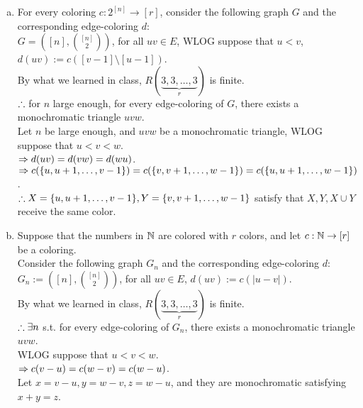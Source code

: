 \begin{pr}$ $
\begin{enumerate}[(a)]
\item For every coloring $c:2^{[n]}\to[r]$, consider the following graph $G$ and the corresponding edge-coloring $d$:\\
$G=\left([n], \binom{[n]}2\right)$, for all $uv\in E$, WLOG suppose that $u<v$, $d(uv):=c([v-1]\setminus[u-1])$.\\
By what we learned in class, $R(\underbrace{3, 3, \dots, 3}_{r})$ is finite.\\
$\therefore$ for $n$ large enough, for every edge-coloring of $G$, there exists a monochromatic triangle $uvw$.\\
Let $n$ be large enough, and $uvw$ be a monochromatic triangle, WLOG suppose that $u<v<w$.\\
$\Rightarrow d(uv)=d(vw)=d(wu)$.\\
$\Rightarrow c(\{u, u+1, \dots, v-1\})=c(\{v, v+1, \dots, w-1\})=c(\{u, u+1, \dots, w-1\})$.\\
$\therefore X=\{u, u+1, \dots, v-1\}, Y=\{v, v+1, \dots, w-1\}$ satisfy that $X, Y, X\cup Y$ receive the same color.

\item Suppose that the numbers in $\mathbb{N}$ are colored with $r$ colors, and let $c:\mathbb{N}\to[r]$ be a coloring.\\
Consider the following graph $G_n$ and the corresponding edge-coloring $d$:\\
$G_n:=\left([n], \binom{[n]}2\right)$, for all $uv\in E$, $d(uv):=c(|u-v|)$.\\
By what we learned in class, $R(\underbrace{3, 3, \dots, 3}_{r})$ is finite.\\
$\therefore\exists n$ s.t. for every edge-coloring of $G_n$, there exists a monochromatic triangle $uvw$.\\
WLOG suppose that $u<v<w$.\\
$\Rightarrow c(v-u)=c(w-v)=c(w-u)$.\\
Let $x=v-u, y=w-v, z=w-u$, and they are monochromatic satisfying $x+y=z$.
\end{enumerate}
\end{pr}
